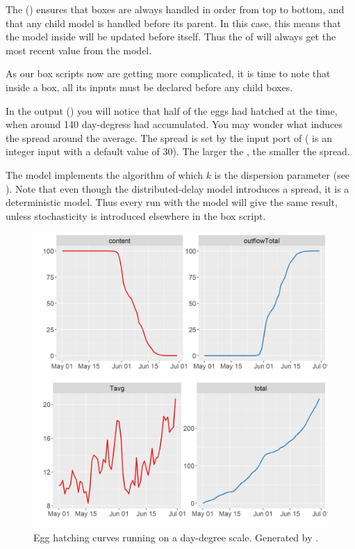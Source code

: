 The  () ensures that boxes are always handled in order from top to bottom, and that any child model is handled before its parent. In this case, this means that the  model inside  will be updated before  itself. Thus the  of  will always get the most recent value from the  model.

As our box scripts now are getting more complicated, it is time to note that inside a box, all its inputs must be declared before any child boxes. 

In the output () you will notice that half of the eggs had hatched at the time, when around 140 day-degress had accumulated. You may wonder what induces the spread around the average. The spread is set by the  input port of  ( is an integer input with a default value of 30). The larger the , the smaller the spread. 

The  model implements the  algorithm of which \(k\) is the dispersion parameter (see ). Note that even though the distributed-delay model introduces a spread, it is a deterministic model. Thus every run with the  model will give the same result, unless stochasticity is introduced elsewhere in the box script.

\begin{figure} [t]
\centering
\includegraphics[scale=0.5]{graphics/egg5}
\caption{Egg hatching curves running on a day-degree scale. Generated by .}
\label{fig:egg5}
\end{figure}


